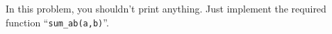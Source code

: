 In this problem, you shouldn't print anything. Just implement the required function ``\texttt{sum_ab(a,b)}''.